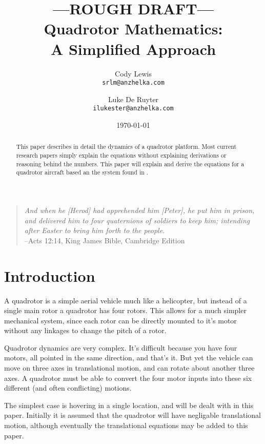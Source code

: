 \documentclass{article}
\numberwithin{equation}{section} %
\begin{document}
\title{---ROUGH DRAFT---\\Quadrotor Mathematics: \\ A Simplified Approach}
\author{Cody Lewis \\ \texttt{srlm@anzhelka.com} \and Luke De Ruyter \\ \texttt{ilukester@anzhelka.com} }
\date{\today}
\maketitle
\begin{verse}\textit{
And when he [Herod] had apprehended him [Peter], he put him in prison, and delivered him to four quaternions of soldiers to keep him; intending after Easter to bring him forth to the people.} \\
\hfill --Acts 12:14, King James Bible, Cambridge Edition
\end{verse}

\begin{abstract}
This paper describes in detail the dynamics of a quadrotor platform. Most current research papers simply explain the equations without explaining derivations or reasoning behind the numbers. This paper will explain and derive the equations for a quadrotor aircraft based an the system found in \cite{stingu09}.
\end{abstract}

\section{Introduction}

A quadrotor is a simple aerial vehicle much like a helicopter, but instead of a single main rotor a quadrotor has four rotors. This allows for a much simpler mechanical system, since each rotor can be directly mounted to it's motor without any linkages to change the pitch of a rotor.

Quadrotor dynamics are very complex. It's difficult because you have four motors, all pointed in the same direction, and that's it. But yet the vehicle can move on three axes in translational motion, and can rotate about another three axes. A quadrotor must be able to convert the four motor inputs into these six different (and often conflicting) motions.

The simplest case is hovering in a single location, and will be dealt with in this paper. Initially it is assumed that the quadrotor will have negligable translational motion, although eventually the translational equations may be added to this paper.
\end{document}
